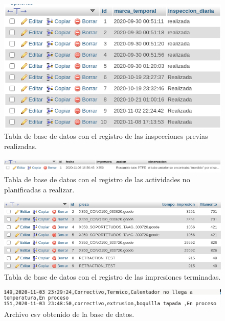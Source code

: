 \begin{figure}[H]
\centering
\includegraphics[scale=0.6]{images/dbiprevia.png}
\caption{Tabla de base de datos con el registro de las inspecciones previas realizadas.}
\label{dbiprevia}
\end{figure}

\begin{figure}[H]
\centering
\includegraphics[scale=0.6]{images/dbplanificadas.png}
\caption{Tabla de base de datos con el registro de las actividades no planificadas a realizar.}
\label{dbplanificadas}
\end{figure}

\begin{figure}[H]
\centering
\includegraphics[scale=0.6]{images/dbterminadas.png}
\caption{Tabla de base de datos con el registro de las impresiones terminadas.}
\label{dbterminadas}
\end{figure}

\begin{figure}[H]
\centering
\includegraphics[scale=0.6]{images/comenzadoscsv.png}
\caption{Archivo csv obtenido de la base de datos.}
\label{comenzadoscsv}
\end{figure}

